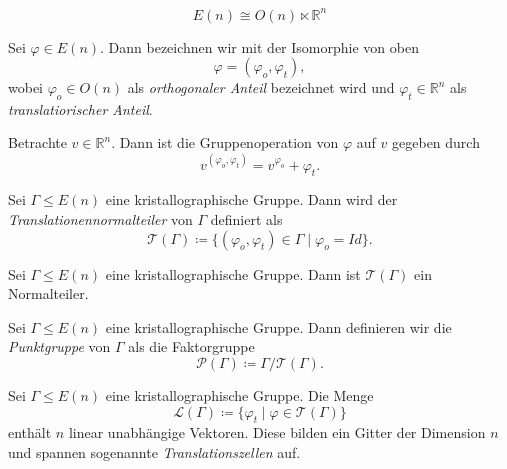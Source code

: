 \documentclass{beamer}
\theoremstyle{plain}
\newcommand\R{\mathbb R}
\renewcommand{\phi}{\varphi}
\newcommand{\T}{\mathcal{T}}
\renewcommand{\P}{\mathcal{P}}
\renewcommand{\L}{\mathcal{L}}
\begin{document}
\begin{frame}
    \begin{proposition}
        $$
            E(n) \cong O(n) \ltimes \R^n
        $$
    \end{proposition}
    \pause
    \begin{notation}
        Sei $\phi \in E(n)$. Dann bezeichnen wir mit der Isomorphie von oben
        $$
            \phi = (\phi_o, \phi_t),
        $$
        wobei $\phi_o \in O(n)$ als \emph{orthogonaler Anteil} bezeichnet wird und $\phi_t \in \R^n$ als \emph{translatiorischer Anteil}.
    \end{notation}
    Betrachte $v \in \R^n$. Dann ist die Gruppenoperation von $\phi$ auf $v$ gegeben durch
    $$
        v^{(\phi_o, \phi_t)} = v^{\phi_o} + \phi_t.
    $$
\end{frame}

\begin{frame}
    \begin{definition}
        Sei $\Gamma \leq E(n)$ eine kristallographische Gruppe. Dann wird der \emph{Translationennormalteiler} von $\Gamma$ definiert als
        $$
            \T(\Gamma) \coloneqq \{ (\phi_o, \phi_t) \in \Gamma \mid \phi_o = Id \}.
        $$
    \end{definition}
    \begin{proposition}
        Sei $\Gamma \leq E(n)$ eine kristallographische Gruppe. Dann ist $\T(\Gamma)$ ein Normalteiler. 
    \end{proposition}
    \begin{definition}
        Sei $\Gamma \leq E(n)$ eine kristallographische Gruppe. Dann definieren wir die \emph{Punktgruppe} von $\Gamma$ als die Faktorgruppe
        $$
            \P(\Gamma) \coloneqq \Gamma / \T(\Gamma).
        $$
    \end{definition}
\end{frame}

\begin{frame}
    \begin{proposition}
        Sei $\Gamma \leq E(n)$ eine kristallographische Gruppe. Die Menge 
        $$
            \L(\Gamma) \coloneqq \{ \phi_t \mid \phi \in \T(\Gamma) \}
        $$
        enthält $n$ linear unabhängige Vektoren. Diese bilden ein Gitter der Dimension $n$ und spannen sogenannte \emph{Translationszellen} auf.
    \end{proposition}
\end{frame}
\end{document}

